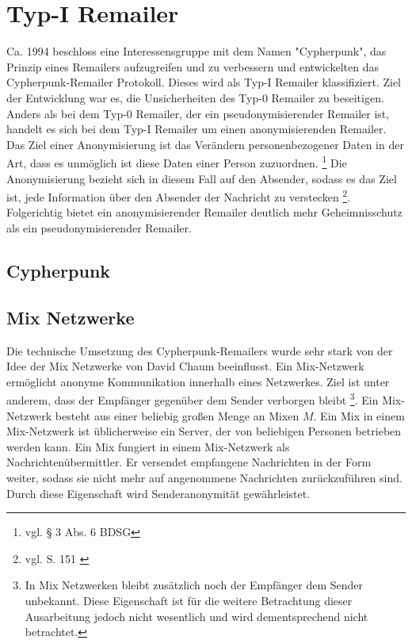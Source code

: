\chapter{Typ-I Remailer}
Ca. 1994 beschloss eine Interessensgruppe mit dem Namen "Cypherpunk", das Prinzip eines Remailers aufzugreifen und zu verbessern und entwickelten das Cypherpunk-Remailer Protokoll. Dieses wird als Typ-I Remailer klassifiziert. Ziel der Entwicklung war es, die Unsicherheiten des Typ-0 Remailer zu beseitigen. 
Anders als bei dem Typ-0 Remailer, der ein pseudonymisierender Remailer ist, handelt es sich bei dem Typ-I Remailer um einen anonymisierenden Remailer. Das Ziel einer Anonymisierung ist das Verändern personenbezogener Daten in der Art, dass es unmöglich ist diese Daten einer Person zuzuordnen. \footnote {vgl. § 3 Abs. 6 BDSG}
Die Anonymisierung bezieht sich in diesem Fall auf den Absender, sodass es das Ziel ist, jede Information über den Absender der Nachricht zu verstecken \footnote{vgl. S. 151 \cite{horster2013datenschutz}}. Folgerichtig bietet ein anonymisierender Remailer deutlich mehr Geheimnisschutz als ein pseudonymisierender Remailer. 


\section{Cypherpunk}

\section{Mix Netzwerke}
Die technische Umsetzung des Cypherpunk-Remailers wurde sehr stark von der Idee der Mix Netzwerke von David Chaum beeinflusst. Ein Mix-Netzwerk ermöglicht anonyme Kommunikation innerhalb eines Netzwerkes. Ziel ist unter anderem, dass der Empfänger gegenüber dem Sender verborgen bleibt \footnote{In Mix Netzwerken bleibt zusätzlich noch der Empfänger dem Sender unbekannt. Diese Eigenschaft ist für die weitere Betrachtung dieser Ausarbeitung jedoch nicht wesentlich und wird dementsprechend nicht betrachtet.}.
Ein Mix-Netzwerk besteht aus einer beliebig großen Menge an Mixen \(M\). Ein Mix in einem Mix-Netzwerk ist üblicherweise ein Server, der von beliebigen Personen betrieben werden kann. Ein Mix fungiert in einem Mix-Netzwerk als Nachrichtenübermittler. Er versendet empfangene Nachrichten in der Form weiter, sodass sie nicht mehr auf angenommene Nachrichten zurückzuführen sind. Durch diese Eigenschaft wird Senderanonymität gewährleistet.

